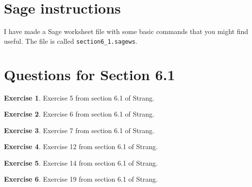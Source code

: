 \documentclass[11pt]{amsart}
\theoremstyle{definition}
\newtheorem{exercise}{Exercise}
\begin{document}
\section{Sage instructions}

I have made a Sage worksheet file with some basic commands that you might find useful. The file is called \texttt{section6\_1.sagews}.


\section{Questions for Section 6.1}
\setcounter{exercise}{140}



\begin{exercise}
Exercise 5 from section 6.1 of Strang.
\end{exercise}

\begin{exercise}
Exercise 6 from section 6.1 of Strang.
\end{exercise}

\begin{exercise}
Exercise 7 from section 6.1 of Strang.
\end{exercise}

\begin{exercise}
Exercise 12 from section 6.1 of Strang.
\end{exercise}

\begin{exercise}
Exercise 14 from section 6.1 of Strang.
\end{exercise}

\begin{exercise}
Exercise 19 from section 6.1 of Strang.
\end{exercise}
\end{document}
